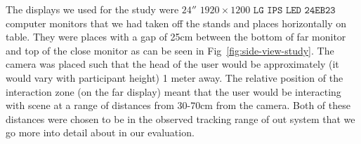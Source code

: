 \begin{invisBox}  
	\hfill
\end{invisBox}

The displays we used for the study were $24''$ $1920 \times 1200$ $\texttt{LG IPS LED 24EB23}$ computer monitors that we had taken off the stands and places horizontally on table. They were places with a gap of 25cm between the bottom of far monitor and top of the close monitor as can be seen in Fig~\ref{fig:side-view-study}. The camera was placed such that the head of the user would be approximately (it would vary with participant height) 1 meter away. The relative position of the interaction zone (on the far display) meant that the user would be interacting with scene at a range of distances from 30-70cm from the camera. Both of these distances were chosen to be in the observed tracking range of out system that we go more into detail about in our evaluation. \\

